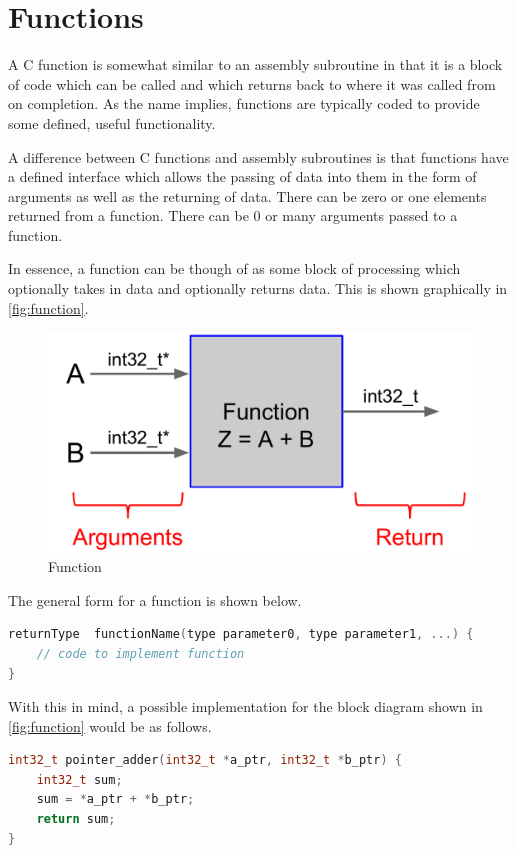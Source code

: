 \chapter{Functions}
A C function is somewhat similar to an assembly subroutine in that it is a block of code which can be called and which returns back to where it was called from on completion. As the name implies, functions are typically coded to provide some defined, useful functionality. 

A difference between C functions and assembly subroutines is that functions have a defined interface which allows the passing of data into them in the form of arguments as well as the returning of data. There can be zero or one elements returned from a function. There can be 0 or many arguments passed to a function.

In essence, a function can be though of as some block of processing which optionally takes in data and optionally returns data. This is shown graphically in \autoref{fig:function}.

\begin{figure}
\centering
\includegraphics[scale=0.5]{./week9/function.pdf}
\caption{Function}
\label{fig:function}
\end{figure}

The general form for a function is shown below.

\begin{lstlisting}[language=c]
returnType  functionName(type parameter0, type parameter1, ...) {
    // code to implement function
}
\end{lstlisting}

With this in mind, a possible implementation for the block diagram shown in \autoref{fig:function} would be as follows. 

\begin{lstlisting}[language=c]
int32_t pointer_adder(int32_t *a_ptr, int32_t *b_ptr) {
    int32_t sum;
    sum = *a_ptr + *b_ptr;
    return sum;
}
\end{lstlisting}

